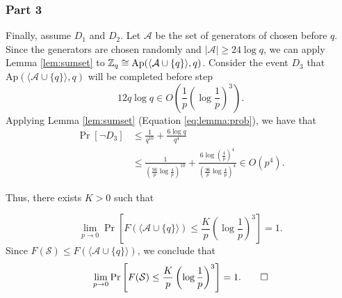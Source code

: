 \subsubsection*{Part 3}

\par Finally, assume $D_1$ and $D_2$. Let $\mathcal{A}$ be the set of generators of chosen before $q$. Since the generators are chosen randomly and $|\mathcal{A}| \geq 24\log q$, we can apply Lemma \ref{lem:sumset} to $\ZZ_q \cong \mathrm{Ap}(\langle\mathcal{A}\cup\{q\}\rangle, q)$. Consider the event $D_3$ that $\mathrm{Ap}(\langle\mathcal{A}\cup\{q\}\rangle, q)$ will be completed before step \[ 12q\log q \in O\left(\frac{1}{p}\left(\log \frac{1}{p}\right)^3\right).\] 
Applying Lemma \ref{lem:sumset} (Equation \ref{eq:lemma:prob}), we have that
\begin{align*}
\Pr[\lnot D_3] &\leq \frac{1}{q^{10}} + \frac{6\log q}{q^4} \\
&\leq \frac{1}{\left(\frac{96}{p}\log \frac{4}{p}\right)^{10}}
+ \frac{6\log\left(\frac{4}{p}\right)^4}{\left(\frac{96}{p}\log\frac{4}{p}\right)^4} \in O(p^4).
\end{align*}
\par 

Thus, there exists $K > 0$ such that 

\[\lim_{p \to  0} \Pr\left[F(\langle\mathcal{A}\cup \{q\}\rangle) \leq \frac{K}{p}\left(\log \frac{1}{p}\right)^3\right] = 1.\]
Since $F(\mathcal{S}) \leq F(\langle \mathcal{A}\cup\{q\}\rangle)$, we conclude that
\[\lim_{p \to 0}\Pr\left[F(\mathcal{S}) \leq \frac{K}{p}\left(\log \frac{1}{p}\right)^3\right] = 1.\qed\]

